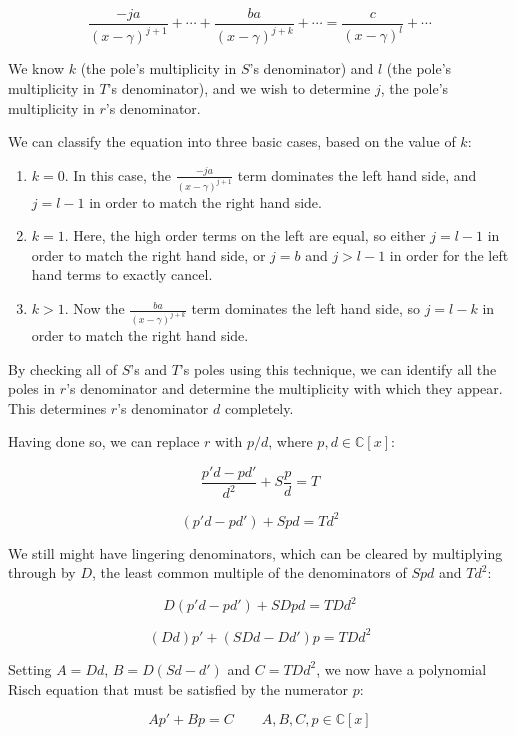 $$\frac{-ja}{(x-\gamma)^{j+1}} + \cdots + \frac{ba}{(x-\gamma)^{j+k}} + \cdots = \frac{c}{(x-\gamma)^l} + \cdots$$

We know $k$ (the pole's multiplicity in $S$'s denominator) and $l$ (the pole's
multiplicity in $T$'s denominator), and we wish to determine $j$, the
pole's multiplicity in $r$'s denominator.

We can classify the equation into three basic cases, based on the value of $k$:

\begin{enumerate}

\item $k=0$.  In this case, the $\frac{-ja}{(x-\gamma)^{j+1}}$ term dominates the left hand side,
and $j = l-1$ in order to match the right hand side.

\item $k=1$.  Here, the high order terms on the left are equal, so either $j=l-1$ in order to match
the right hand side, or $j=b$ and $j>l-1$ in order for the left hand terms to exactly cancel.

\item $k>1$.  Now the $\frac{ba}{(x-\gamma)^{j+k}}$ term dominates the left hand side, so $j=l-k$ in
order to match the right hand side.

\end{enumerate}

By checking all of $S$'s and $T$'s poles using this technique, we can
identify all the poles in $r$'s denominator and determine the
multiplicity with which they appear.  This determines $r$'s
denominator $d$ completely.

Having done so, we can replace $r$ with $p/d$, where $p,d \in {\mathbb C}[x]$:

$$\frac{p'd-pd'}{d^2} + S \frac{p}{d} = T$$

$$(p'd-pd') + S pd = T d^2$$

We still might have lingering denominators, which can be cleared by
multiplying through by $D$, the least common multiple of the
denominators of $Spd$ and $Td^2$:

$$ D (p'd-pd') + S D pd = T D d^2$$

$$(D d) p' + (S D d - D d')p = T D d^2$$

Setting $A=Dd$, $B=D(Sd - d')$ and $C=TDd^2$, we now have a polynomial Risch equation
that must be satisfied by the numerator $p$:

\begin{equation}
\label{eq: C[x] Risch}
A p' + B p = C \qquad A,B,C,p \in {\mathbb C}[x]
\end{equation}

